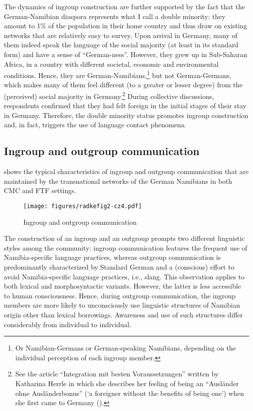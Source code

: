 \documentclass[output=paper]{langsci/langscibook}
\begin{document}
The dynamics of ingroup construction are further supported by the fact that the German-Namibian diaspora represents what I call a double minority: they amount to 1\% of the population in their home country and thus draw on existing networks that are relatively easy to survey. Upon arrival in Germany, many of them indeed speak the language of the social majority (at least in its standard form) and have a sense of “German-ness”. However, they grew up in Sub-Saharan Africa, in a country with different societal, economic and environmental conditions. Hence, they are German-Namibians,\footnote{Or Namibian-Germans or German-speaking Namibians, depending on the individual perception of each ingroup member.} but not German-Germans, which makes many of them feel different (to a greater or lesser degree) from the (perceived) social majority in Germany.\footnote{See the article “Integration mit besten Voraussetzungen” written by Katharina Herrle in which she describes her feeling of being an “Ausländer ohne Ausländerbonus” (‘a foreigner without the benefits of being one’) when she first came to Germany (\citealt[66]{herrle_integration_2016}).} During collective discussions, respondents confirmed that they had felt foreign in the initial stages of their stay in Germany. Therefore, the double minority status promotes ingroup construction and, in fact, triggers the use of language contact phenomena. 

 
   
\subsection{Ingroup and outgroup communication}
  \label{sec:radke:3.2}
 

 shows the typical characteristics of ingroup and outgroup communication that are maintained by the transnational networks of the German Namibians in both CMC and FTF settings. 

\begin{sidewaysfigure}
 \texttt{[image: figures/radkefig2-cz4.pdf]}
\caption{Ingroup and outgroup communication}
\label{fig:radke:2}
\end{sidewaysfigure}  

The construction of an ingroup and an outgroup prompts two different linguistic styles among the community: ingroup communication features the frequent use of Namibia-specific language practices, whereas outgroup communication is predominantly characterized by Standard German and a (conscious) effort to avoid Namibia-specific language practices, i.e., slang. This observation applies to both lexical and morphosyntactic variants. However, the latter is less accessible to human consciousness. Hence, during outgroup communication, the ingroup members are more likely to unconsciously use linguistic structures of Namibian origin other than lexical borrowings. Awareness and use of such structures differ considerably from individual to individual. 
\end{document}
